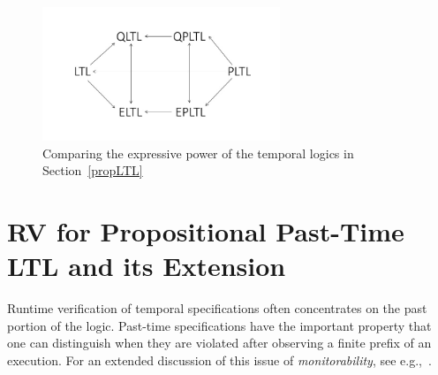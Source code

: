 \begin{figure}
\begin{center}
\includegraphics[width=2.8in]{PROP.jpg}
\caption{\label{prop}
Comparing the expressive power of the temporal logics in Section~\ref{propLTL}
}
\end{center}
\end{figure}




\section{RV for Propositional Past-Time LTL and its Extension}
\label{LTLruntime}

Runtime verification of temporal specifications often
concentrates on the past portion of the logic.  Past-time  specifications have the important property that one can distinguish when they are violated after observing a finite prefix of
an execution. For an extended discussion of this issue of {\em monitorability}, see e.g.,~\cite{Ugly,FFM}.

